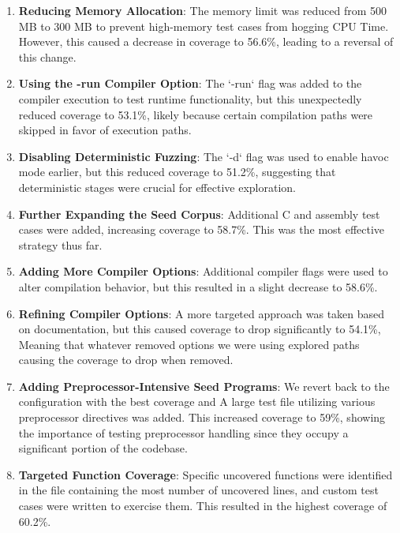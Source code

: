\documentclass[conference]{IEEEtran}
\begin{document}
\begin{enumerate}
    \item 	\textbf{Reducing Memory Allocation}: The memory limit was reduced from 500 MB to 300 MB to prevent high-memory test cases from hogging CPU Time. However, this caused a decrease in coverage to 56.6\%, leading to a reversal of this change.
    
    \item 	\textbf{Using the -run Compiler Option}: The `-run` flag was added to the compiler execution to test runtime functionality, but this unexpectedly reduced coverage to 53.1\%, likely because certain compilation paths were skipped in favor of execution paths.
    
    \item 	\textbf{Disabling Deterministic Fuzzing}: The `-d` flag was used to enable havoc mode earlier, but this reduced coverage to 51.2\%, suggesting that deterministic stages were crucial for effective exploration.
    
    \item 	\textbf{Further Expanding the Seed Corpus}: Additional C and assembly test cases were added, increasing coverage to 58.7\%. This was the most effective strategy thus far.
    
    \item 	\textbf{Adding More Compiler Options}: Additional compiler flags were used to alter compilation behavior, but this resulted in a slight decrease to 58.6\%.
    
    \item 	\textbf{Refining Compiler Options}: A more targeted approach was taken based on documentation, but this caused coverage to drop significantly to 54.1\%, Meaning that whatever removed options we were using explored paths causing the coverage to drop when removed.
    
    \item 	\textbf{Adding Preprocessor-Intensive Seed Programs}: We revert back to the configuration with the best coverage and A large test file utilizing various preprocessor directives was added. This increased coverage to 59\%, showing the importance of testing preprocessor handling since they occupy a significant portion of the codebase.
    
    \item 	\textbf{Targeted Function Coverage}: Specific uncovered functions were identified in the file containing the most number of uncovered lines, and custom test cases were written to exercise them. This resulted in the highest coverage of 60.2\%.
\end{enumerate}
\end{document}
